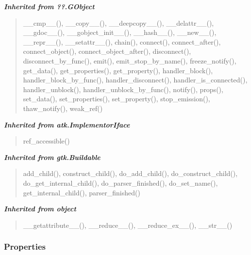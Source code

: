 \large{\textbf{\textit{Inherited from ??.GObject}}}

\begin{quote}
\_\_cmp\_\_(), \_\_copy\_\_(), \_\_deepcopy\_\_(), \_\_delattr\_\_(), \_\_gdoc\_\_(), \_\_gobject\_init\_\_(), \_\_hash\_\_(), \_\_new\_\_(), \_\_repr\_\_(), \_\_setattr\_\_(), chain(), connect(), connect\_after(), connect\_object(), connect\_object\_after(), disconnect(), disconnect\_by\_func(), emit(), emit\_stop\_by\_name(), freeze\_notify(), get\_data(), get\_properties(), get\_property(), handler\_block(), handler\_block\_by\_func(), handler\_disconnect(), handler\_is\_connected(), handler\_unblock(), handler\_unblock\_by\_func(), notify(), props(), set\_data(), set\_properties(), set\_property(), stop\_emission(), thaw\_notify(), weak\_ref()
\end{quote}

\large{\textbf{\textit{Inherited from atk.ImplementorIface}}}

\begin{quote}
ref\_accessible()
\end{quote}

\large{\textbf{\textit{Inherited from gtk.Buildable}}}

\begin{quote}
add\_child(), construct\_child(), do\_add\_child(), do\_construct\_child(), do\_get\_internal\_child(), do\_parser\_finished(), do\_set\_name(), get\_internal\_child(), parser\_finished()
\end{quote}

\large{\textbf{\textit{Inherited from object}}}

\begin{quote}
\_\_getattribute\_\_(), \_\_reduce\_\_(), \_\_reduce\_ex\_\_(), \_\_str\_\_()
\end{quote}


  \subsubsection{Properties}

